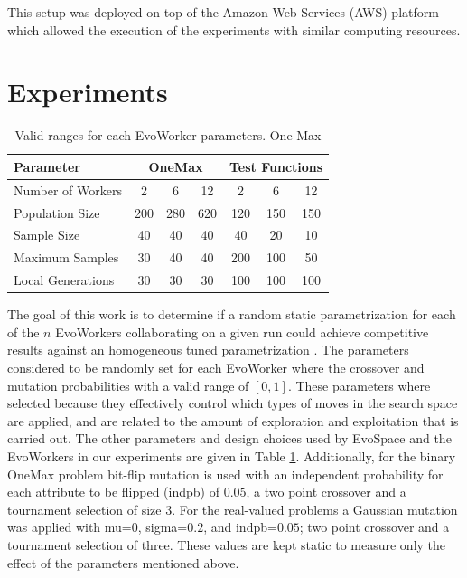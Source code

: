 \documentclass[conference]{IEEEtran}
\begin{document}
This setup was deployed on top of the Amazon Web Services (AWS)
platform which allowed the execution of the experiments with similar computing resources.

\section{Experiments}
 \label{sec:experiments}

\begin{table}[!t]
\caption{Valid ranges for each EvoWorker parameters. One Max}
\label{tab:params}
\centering
\begin{tabular}{|l|c|c|c|c|c|c| }
\hline
\textbf{Parameter} & \multicolumn{3}{|c|}{OneMax} & \multicolumn{3}{|c|}{Test Functions} \\
\hline
Number of Workers & 2 & 6 & 12 & 2 & 6 & 12\\
\hline
\hline
Population Size & 200 & 280 & 620 & 120 & 150 & 150\\
\hline
Sample Size & 40 & 40 & 40 & 40 & 20 & 10\\
\hline
Maximum Samples & 30 & 40 & 40 & 200 & 100 & 50\\
\hline
Local Generations & 30 & 30 & 30 & 100 & 100 & 100\\
\hline
\end{tabular}
\end{table}
%
The goal of this work is to determine if a random static parametrization for each of the $n$ EvoWorkers
collaborating on a given run could achieve competitive results against an homogeneous tuned parametrization
\cite{fuku1,fuku2,garcia2014randomized}. The parameters considered to be randomly set for each EvoWorker
where the crossover and mutation probabilities with a valid range of $[0,1]$. These parameters where
selected because they effectively control which types of moves in the search space are
applied, and are related to the amount of exploration and exploitation
that is carried out. %
The other parameters and design choices used by EvoSpace and the EvoWorkers in our experiments are given in
Table \ref{tab:params}. Additionally, for the binary OneMax problem bit-flip mutation
is used with an independent probability for each attribute to be flipped (indpb) of $0.05$,
a two point crossover and a tournament selection of size 3. For the real-valued problems a Gaussian
mutation was applied with mu=$0$, sigma=$0.2$, and indpb=$0.05$; two point crossover and
a tournament selection of three. These values are kept static to measure only the effect of the
parameters mentioned above.
\end{document}
